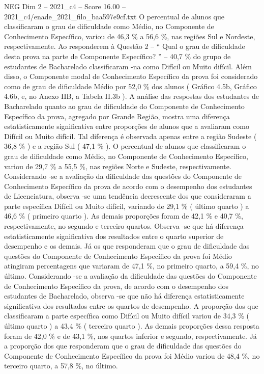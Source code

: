 \begin{textsample}{NEG Dim 2 – 2021\_c4 – Score 16.00 – 2021\_c4/enade\_2021\_filo\_baa597e9cf.txt}
O percentual de alunos que classificaram o grau de dificuldade como Médio, no Componente de Conhecimento Específico, variou de 46,3 \% a 56,6 \%, nas regiões Sul e Nordeste, respectivamente.
Ao responderem à Questão 2 – “ Qual o grau de dificuldade desta prova na parte de Componente Específico? ” – 40,7 \% do grupo de estudantes de Bacharelado classificaram -na como Difícil ou Muito difícil.
Além disso, o Componente modal de Conhecimento Específico da prova foi considerado como de grau de dificuldade Médio por 52,0 \% dos alunos ( Gráfico 4.5b, Gráfico 4.6b, e, no Anexo IIB, a Tabela II.3b ).
A análise das respostas dos estudantes de Bacharelado quanto ao grau de dificuldade do Componente de Conhecimento Específico da prova, agregado por Grande Região, mostra uma diferença estatisticamente significativa entre proporções de alunos que a avaliaram como Difícil ou Muito difícil.
Tal diferença é observada apenas entre a região Sudeste ( 36,8 \% ) e a região Sul ( 47,1 \% ).
O percentual de alunos que classificaram o grau de dificuldade como Médio, no Componente de Conhecimento Específico, variou de 29,7 \% a 55,5 \%, nas regiões Norte e Sudeste, respectivamente.
Considerando -se a avaliação da dificuldade das questões do Componente de Conhecimento Específico da prova de acordo com o desempenho dos estudantes de Licenciatura, observa -se uma tendência decrescente dos que consideraram a parte específica Difícil ou Muito difícil, variando de 29,1 \% ( último quarto ) a 46,6 \% ( primeiro quarto ).
As demais proporções foram de 42,1 \% e 40,7 \%, respectivamente, no segundo e terceiro quartos.
Observa -se que há diferença estatisticamente significativa dos resultados entre o quarto superior de desempenho e os demais.
Já os que responderam que o grau de dificuldade das questões do Componente de Conhecimento Específico da prova foi Médio atingiram percentagens que variaram de 47,1 \%, no primeiro quarto, a 59,4 \%, no último.
Considerando -se a avaliação da dificuldade das questões do Componente de Conhecimento Específico da prova, de acordo com o desempenho dos estudantes de Bacharelado, observa -se que não há diferença estatisticamente significativa dos resultados entre os quartos de desempenho.
A proporção dos que classificaram a parte específica como Difícil ou Muito difícil variou de 34,3 \% ( último quarto ) a 43,4 \% ( terceiro quarto ).
As demais proporções dessa resposta foram de 42,0 \% e de 43,1 \%, nos quartos inferior e segundo, respectivamente.
Já a proporção dos que responderam que o grau de dificuldade das questões do Componente de Conhecimento Específico da prova foi Médio variou de 48,4 \%, no terceiro quarto, a 57,8 \%, no último.

\end{textsample}
